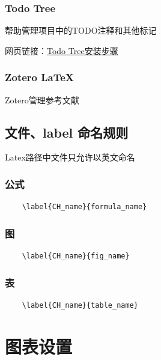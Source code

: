 \documentclass[engineeringmaster]{hquThesis}
\begin{document}
\subsection*{Todo Tree}
帮助管理项目中的TODO注释和其他标记

网页链接：\href{https://blog.csdn.net/m0_37586991/article/details/104239568}{Todo Tree安装步骤}

\subsection*{Zotero LaTeX}
Zotero管理参考文献
\section{文件、label 命名规则}
Latex路径中文件只允许以英文命名

\subsection*{公式}
\begin{lstlisting}
    \label{CH_name}{formula_name}
\end{lstlisting}

\subsection*{图}
\begin{lstlisting}
    \label{CH_name}{fig_name}
\end{lstlisting}

\subsection*{表}
\begin{lstlisting}
    \label{CH_name}{table_name}
\end{lstlisting}


\chapter{图表设置}
\end{document}
